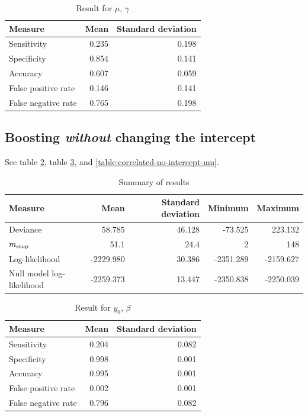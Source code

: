 \begin{table}\caption{Result for $\mu$, $\gamma$}\label{table:correlated-intercept-mu}
\begin{tabular}{l|rr}
Measure     & Mean   & Standard deviation     \\
\hline
Sensitivity & 0.235 & 0.198 \\
Specificity & 0.854 & 0.141 \\
Accuracy    & 0.607 & 0.059 \\
False positive rate         & 0.146 & 0.141 \\
False negative rate         & 0.765 & 0.198
\end{tabular}
\end{table}

\subsection{Boosting \textit{without} changing the intercept}
See table \ref{table:correlated-no-intercept-summary}, table \ref{table:correlated-no-intercept-y0}, and \ref{table:correlated-no-intercept-mu}.
\begin{table}\caption{Summary of results}\label{table:correlated-no-intercept-summary}
\begin{tabular}{l|rrrr}
Measure &    Mean &     Standard deviation &  Minimum & Maximum \\
\hline
Deviance    &    58.785 & 46.128 &   -73.525 &   223.132 \\
$m_{\text{stop}}$      &    51.1 & 24.4 &     2 &   148 \\
Log-likelihood      & -2229.980 & 30.386 & -2351.289 & -2159.627 \\
Null model log-likelihood & -2259.373 & 13.447 & -2350.838 & -2250.039
\end{tabular}
\end{table}

\begin{table}\caption{Result for $y_0$, $\beta$}\label{table:correlated-no-intercept-y0}
\begin{tabular}{l|rr}
Measure &  Mean &    Standard deviation \\
\hline
Sensitivity & 0.204 & 0.082 \\
Specificity & 0.998 & 0.001 \\
Accuracy    & 0.995 & 0.001 \\
False positive rate         & 0.002 & 0.001 \\
False negative rate         & 0.796 & 0.082
\end{tabular}
\end{table}



